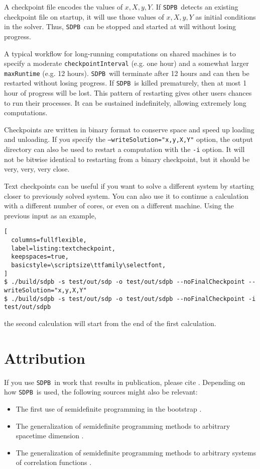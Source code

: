 \documentclass[12pt]{article}
\numberwithin{equation}{section}
\newcommand\SDPB{\texttt{SDPB}}
\begin{document}
A checkpoint file encodes the values of $x,X,y,Y$.  If \SDPB\ detects an existing checkpoint file on startup, it will use those values of $x,X,y,Y$ as initial conditions in the solver.  Thus, \SDPB\ can be stopped and started at will without losing progress.

A typical workflow for long-running computations on shared machines is to specify a moderate \texttt{checkpointInterval} (e.g. one hour) and a somewhat larger \texttt{maxRuntime} (e.g. 12 hours).  \SDPB\ will terminate after 12 hours and can then be restarted without losing progress.  If \SDPB\ is killed prematurely, then at most 1 hour of progress will be lost.  This pattern of restarting gives other users chances to run their processes.  It can be sustained indefinitely, allowing extremely long computations.

Checkpoints are written in binary format to conserve space and speed
up loading and unloading.  If you specify the \texttt{--writeSolution="x,y,X,Y"}
option, the output directory can also be used to restart a computation
with the \texttt{-i} option.  It will not be bitwise identical to
restarting from a binary checkpoint, but it should be very, very, very
close.

Text checkpoints can be useful if you want to solve a different system
by starting closer to previously solved system.  You can also use it
to continue a calculation with a different number of cores, or even on
a different machine.  Using the previous input as an example,

\begin{lstlisting}[
  columns=fullflexible,
  label=listing:textcheckpoint,
  keepspaces=true,
  basicstyle=\scriptsize\ttfamily\selectfont,
]
$ ./build/sdpb -s test/out/sdp -o test/out/sdpb --noFinalCheckpoint --writeSolution="x,y,X,Y"
$ ./build/sdpb -s test/out/sdp -o test/out/sdpb --noFinalCheckpoint -i test/out/sdpb
\end{lstlisting}
the second calculation will start from the end of the first calculation.

\section{Attribution}

If you use \SDPB\ in work that results in publication, please cite \cite{DSD}. Depending on how \SDPB\ is used, the following sources might also be relevant:
\begin{itemize}
\item The first use of semidefinite programming in the bootstrap \cite{Poland:2011ey}.
\item The generalization of semidefinite programming methods to arbitrary
spacetime dimension \cite{Kos:2013tga}.
\item The generalization of semidefinite programming methods to arbitrary
systems of correlation functions \cite{Kos:2014bka}.
\end{itemize}
\end{document}
